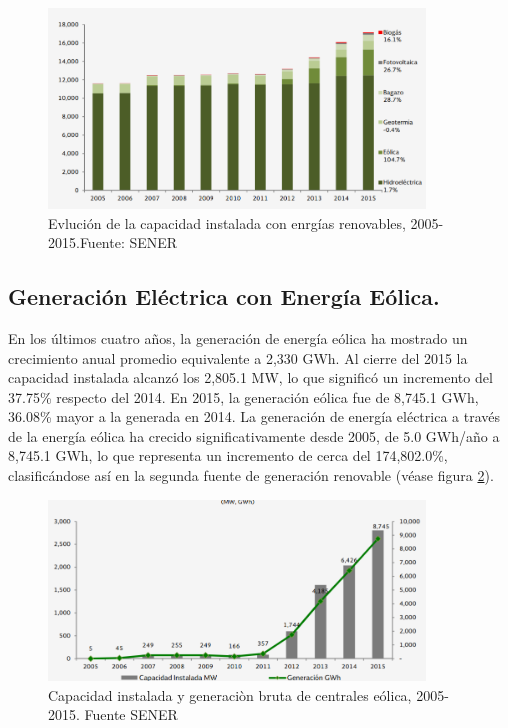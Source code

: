 \begin{figure}[!h]
	\centering
	\includegraphics[width=10cm]{img/instalacion.png}
	\caption{Evlución de la capacidad instalada con enrgías renovables, 2005-2015.Fuente: SENER}
	\label{instalacion}
\end{figure}

\subsection{Generación Eléctrica con Energía Eólica.}
En los últimos cuatro años, la generación de energía eólica ha mostrado un crecimiento anual promedio equivalente a 2,330 GWh. Al cierre del 2015 la capacidad instalada alcanzó los 2,805.1 MW, lo que significó un incremento del 37.75\% respecto del 2014. En 2015, la generación eólica fue de 8,745.1 GWh, 36.08\% mayor a la generada en 2014. La generación de energía eléctrica a través de la energía eólica ha crecido significativamente desde 2005, de 5.0 GWh/año a 8,745.1 GWh, lo que representa un incremento de cerca del 174,802.0\%, clasificándose así en la segunda fuente de generación renovable (véase figura \ref{eolica}).

\begin{figure}[!h]
	\centering
	\includegraphics[width=10cm]{img/eolica.png}
	\caption{Capacidad instalada y generaciòn bruta de centrales eólica, 2005-2015. Fuente SENER}
	\label{eolica}
\end{figure}

